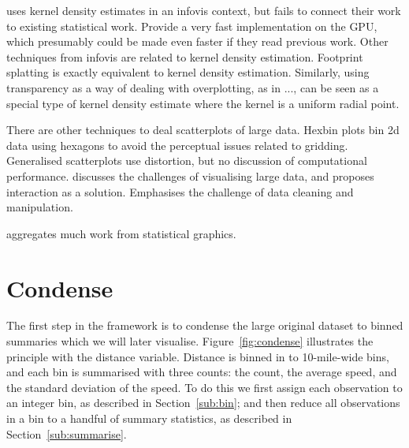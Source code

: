\documentclass[journal]{vgtc}                %
\begin{document}
\citep{lampe:2011} uses kernel density estimates in an infovis context, but fails to connect their work to existing statistical work. Provide a very fast implementation on the GPU, which presumably could be made even faster if they read previous work. Other techniques from infovis are related to kernel density estimation. Footprint splatting \citep{becker:1997,yang:2003} is exactly equivalent to kernel density estimation. Similarly, using transparency as a way of dealing with overplotting, as in ..., can be seen as a special type of kernel density estimate where the kernel is a uniform radial point.

There are other techniques to deal scatterplots of large data. Hexbin plots \citep{carr:1987} bin 2d data using hexagons to avoid the perceptual issues related to gridding. Generalised scatterplots \citep{keim:2010} use distortion, but no discussion of computational performance. \citep{heer:2012} discusses the challenges of visualising large data, and proposes interaction as a solution. Emphasises the challenge of data cleaning and manipulation.

\citep{unwin:2006} aggregates much work from statistical graphics.


\section{Condense}
\label{sec:condense}

The first step in the framework is to condense the large original dataset to binned summaries which we will later visualise. Figure~\ref{fig:condense} illustrates the principle with the distance variable. Distance is binned in to 10-mile-wide bins, and each bin is summarised with three counts: the count, the average speed, and the standard deviation of the speed. To do this we first assign each observation to an integer bin, as described in Section~\ref{sub:bin}; and then reduce all observations in a bin to a handful of summary statistics, as described in Section~\ref{sub:summarise}.
\end{document}
